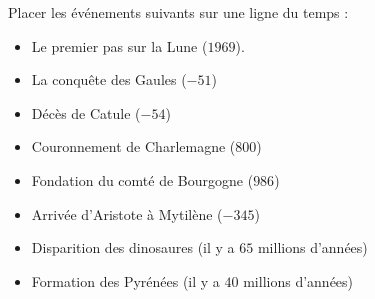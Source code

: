 
Placer les événements suivants sur une ligne du temps :
\begin{itemize}
    \item Le premier pas sur la Lune (\( 1969\)).
    \item La conquête des Gaules (\( -51\))
    \item Décès de Catule (\( -54\))
    \item Couronnement de Charlemagne (\( 800\))
    \item Fondation du comté de Bourgogne (\( 986\))
    \item Arrivée d'Aristote à Mytilène (\( -345\))
    \item Disparition des dinosaures (il y a \( 65\) millions d'années)
    \item Formation des Pyrénées (il y a \( 40\) millions d'années)
\end{itemize}

